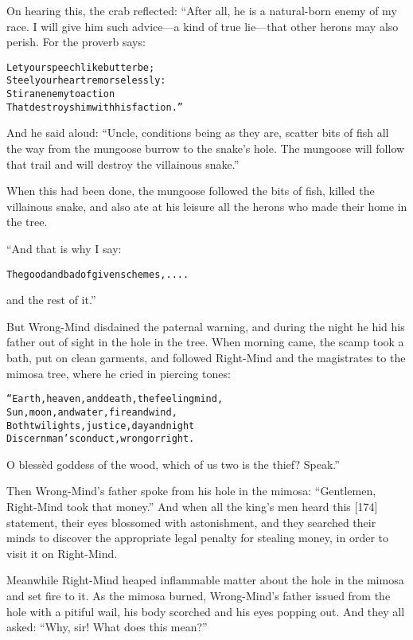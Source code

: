 \documentclass{article}
\renewenvironment{verbatim}{\begin{alltt}\normalfont\begin{centering}}{\end{centering}\end{alltt}}
\begin{document}
On hearing this, the crab reflected: “After all, he is a
natural-born enemy of my race. I will give him such advice---a kind
of true lie---that other herons may also perish. For the proverb
says:

\begin{verbatim}
Let your speech like butter be;
Steel your heart remorselessly:
Stir an enemy to action
That destroys him with his faction.”
\end{verbatim}
And he said aloud:
``Uncle, conditions being as they are, scatter bits of fish all the way from the mungoose burrow to the snake's hole. The mungoose will follow that trail and will destroy the villainous snake.''

When this had been done, the mungoose followed the bits of fish,
killed the villainous snake, and also ate at his leisure all the
herons who made their home in the tree.

“And that is why I say:

\begin{verbatim}
The good and bad of given schemes, ....
\end{verbatim}
and the rest of it.”

But Wrong-Mind disdained the paternal warning, and during the night
he hid his father out of sight in the hole in the tree. When
morning came, the scamp took a bath, put on clean garments, and
followed Right-Mind and the magistrates to the mimosa tree, where
he cried in piercing tones:

\begin{verbatim}
“Earth, heaven, and death, the feeling mind,
Sun, moon, and water, fire and wind,
Both twilights, justice, day and night
Discern man's conduct, wrong or right.
\end{verbatim}
O blessèd goddess of the wood, which of us two is the thief?
Speak.”

Then Wrong-Mind's father spoke from his hole in the mimosa:
``Gentlemen, Right-Mind took that money.'' And when all the king's
men heard this [174] statement, their eyes blossomed with
astonishment, and they searched their minds to discover the
appropriate legal penalty for stealing money, in order to visit it
on Right-Mind.

Meanwhile Right-Mind heaped inflammable matter about the hole in
the mimosa and set fire to it. As the mimosa burned, Wrong-Mind's
father issued from the hole with a pitiful wail, his body scorched
and his eyes popping out. And they all asked:
``Why, sir! What does this mean?''
\end{document}
